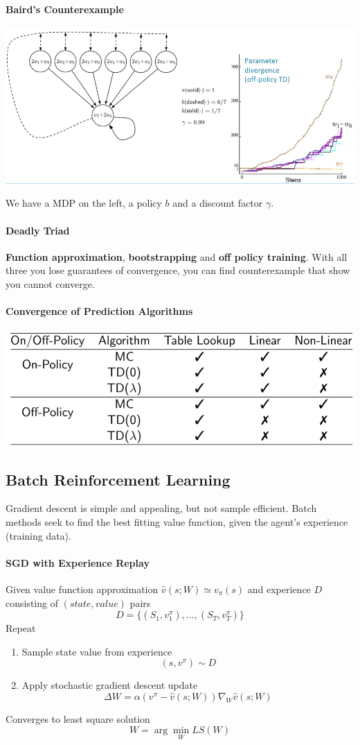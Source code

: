 \documentclass[10pt]{report}
\begin{document}
\paragraph{Baird's Counterexample}
\begin{center}
	\includegraphics[scale=0.5]{177.png}
\end{center}
We have a MDP on the left, a policy $b$ and a discount factor $\gamma$.
\paragraph{Deadly Triad} \textbf{Function approximation}, \textbf{bootstrapping} and \textbf{off policy training}. With all three you lose guarantees of convergence, you can find counterexample that show you cannot converge.
\paragraph{Convergence of Prediction Algorithms}
\begin{center}
	\includegraphics[scale=0.5]{178.png}
\end{center}
\subsection{Batch Reinforcement Learning}
Gradient descent is simple and appealing, but not sample efficient. Batch methods seek to find the best fitting value function, given the agent's experience (training data).
\paragraph{SGD with Experience Replay} Given value function approximation $\hat{v}(s;W)\simeq v_\pi(s)$ and experience $D$ consisting of $(state, value)$ pairs
$$D=\{(S_1,v_1^\pi),\ldots,(S_T,v_T^\pi)\}$$
Repeat
\begin{enumerate}
	\item Sample state value from experience $$(s,v^\pi)\sim D$$
	\item Apply stochastic gradient descent update
	$$\Delta W=\alpha(v^\pi - \hat{v}(s;W))\nabla_W\hat{v}(s;W)$$
\end{enumerate}
Converges to least square solution
$$W=\arg\min_W LS(W)$$
\end{document}
